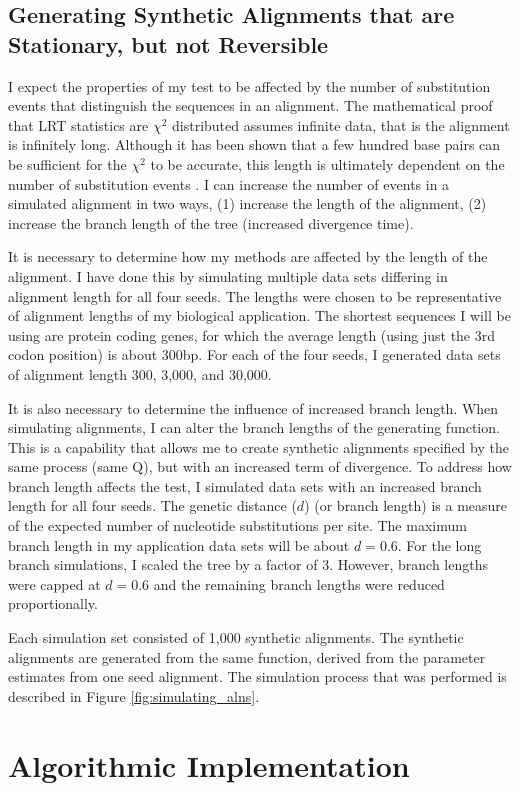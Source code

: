 \subsection{Generating Synthetic Alignments that are Stationary, but not Reversible}
I expect the properties of my test to be affected by the number of substitution events that distinguish the sequences in an alignment. The mathematical proof that LRT statistics are $\chi^{2}$ distributed assumes infinite data, that is the alignment is infinitely long. Although it has been shown that a few hundred base pairs can be sufficient for the $\chi^{2}$ to be accurate, this length is ultimately dependent on the number of substitution events \cite{Ota2000AppropriateParameters}. I can increase the number of events in a simulated alignment in two ways, (1) increase the length of the alignment, (2) increase the \gls{branch length} of the tree (increased divergence time). 

It is necessary to determine how my methods are affected by the length of the alignment. I have done this by simulating multiple data sets differing in alignment length for all four seeds. The lengths were chosen to be representative of alignment lengths of my biological application. The shortest sequences I will be using are protein coding genes, for which the average length (using just the 3rd codon position) is about 300bp. For each of the four seeds, I generated data sets of alignment length 300, 3,000, and 30,000.   

It is also necessary to determine the influence of increased branch length. When simulating alignments, I can alter the branch lengths of the generating function. This is a capability that allows me to create synthetic alignments specified by the same process (same $\mathrm{Q}$), but with an increased term of divergence. To address how branch length affects the test, I simulated data sets with an increased branch length for all four seeds. The genetic distance ($d$) (or branch length) is a measure of the expected number of nucleotide substitutions per site. The maximum branch length in my application data sets will be about $d=0.6$. For the long branch simulations, I scaled the tree by a factor of 3. However, branch lengths were capped at $d=0.6$ and the remaining branch lengths were reduced proportionally. 

Each simulation set consisted of 1,000 synthetic alignments. The synthetic alignments are generated from the same function, derived from the parameter estimates from one seed alignment. The simulation process that was performed is described in Figure \ref{fig:simulating_alns}.



\section{Algorithmic Implementation}

